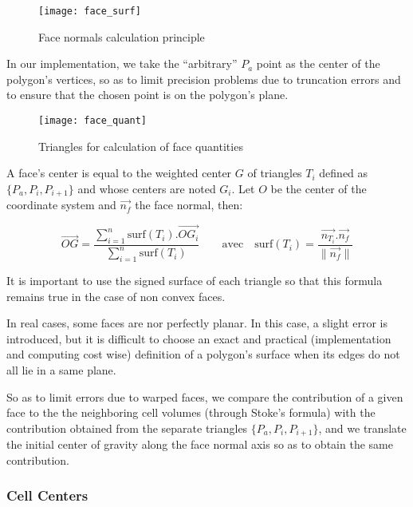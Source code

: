 \begin{figure}[!h]
\centerline{
\texttt{[image: face\_surf]}}
\caption{Face normals calculation principle}
\label{fig:algo.norm_fac.principle}
\end{figure}

In our implementation, we take the ``arbitrary'' $P_a$ point as
the center of the polygon's vertices, so as to limit
precision problems due to truncation errors and to ensure that
the chosen point is on the polygon's plane.

\begin{figure}[!h]
\centerline{
\texttt{[image: face\_quant]}}
\caption{Triangles for calculation of face quantities}
\label{fig:algo.grd_fac.triangles}
\end{figure}

A face's center is equal to the weighted center $G$ of triangles
$T_i$ defined as $\{P_a, P_i, P_{i+1}\}$ and whose centers are
noted $G_i$. Let $O$ be the center of the coordinate system and
$\overrightarrow{n_f}$ the face normal, then:

\begin{displaymath}
\overrightarrow{OG}
= \frac{\sum_{i=1}^n \textrm{surf}(T_i).\overrightarrow{OG_i}}
       {\sum_{i=1}^n \textrm{surf}(T_i)}
\qquad \textrm {avec} \quad
\textrm{surf}(T_i) = \frac{\overrightarrow{n_{T_i}}.\overrightarrow{n_f}}
                          {\parallel \overrightarrow{n_f} \parallel}
\end{displaymath}

It is important to use the signed surface of each triangle so
that this formula remains true in the case of non convex faces.

In real cases, some faces are nor perfectly planar. In this case,
a slight error is introduced, but it is difficult to choose an exact
and practical (implementation and computing cost wise) definition of a
polygon's surface when its edges do not all lie in a same plane.

So as to limit errors due to warped faces, we compare the contribution
of a given face to the the neighboring cell volumes (through
Stoke's formula) with the contribution obtained from the separate
triangles $\{P_a, P_i, P_{i+1}\}$, and we translate the initial center
of gravity along the face normal axis so as to obtain the same contribution.

\subsubsection*{Cell Centers%
               \label{sec:geo_quant.cdgcel}}

